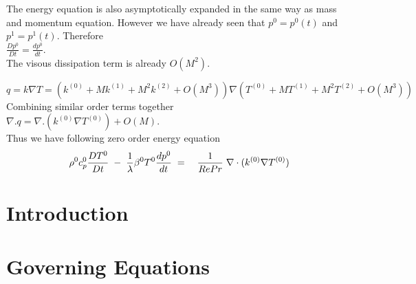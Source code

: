 \documentclass[11pt,a4paper]{article}
\begin{document}
 The energy equation is also asymptotically expanded in the same way as mass and momentum equation. However we have already seen that $p^0=p^0(t)$ and $p^1=p^1(t)$. Therefore \\
 $\frac{Dp^0}{Dt}= \frac{dp^0}{dt}$. \\
 The visous dissipation term is already $O(M^2)$.
 
$q=k \nabla T = (k^{(0)}+Mk^{(1)}+M^2k^{(2)}+O(M^3)) \nabla (T^{(0)}+MT^{(1)}+M^2T^{(2)}+O(M^3))$ \\
Combining similar order terms together \\
$\nabla . q =  \nabla . (k^{(0)} \nabla T^{(0)}) + O(M)$. \\
Thus we have following zero order energy equation
\begin{eqnarray}
 \rho^0 c_p^0 \frac{D T^0}{D t}\hspace{1mm}-\hspace{1mm}\frac{1}{\lambda} \beta^0 T^0 \frac{d p^0}{d t} \hspace{1mm} &=& \hspace{1mm} \frac{1}{RePr} \hspace{1mm} \nabla \cdot (k^{(0)} \nabla T^{(0)})
\end{eqnarray}
\section{Introduction}
\section{Governing Equations}
\end{document}
